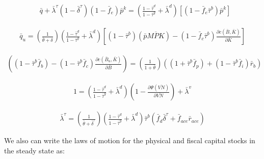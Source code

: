  \begin{equation}
\label{eqn:foc_i_tax_ss}
\begin{split}
 & \bar{q} + \bar{\lambda}^{\tau}(1-\bar{\delta}^{\tau})(1-\bar{f}_{e})\bar{p}^{k} =  \left(\frac{1-\bar{\tau}^{d}}{1-\bar{\tau}^{g}} + \bar{\lambda}^{d}\right)\left[(1-\bar{f}_{e}\bar{\tau}^{b})\bar{p}^{k}\right]
\end{split}
\end{equation}


 \begin{equation}
\label{eqn:foc_k_tax_ss}
\begin{split}
\bar{q}_{u} = \left(\frac{1}{\bar{\theta}+\delta}\right) \left(\frac{1-\bar{\tau}^{d}}{1-\bar{\tau}^{g}} + \bar{\lambda}^{d} \right)\left[(1-\bar{\tau}^{b})\left(\bar{p}\overline{MPK}\right)-(1-\bar{f}_{c}\bar{\tau}^{b}) \frac{\partial c(\bar{B},\bar{K})}{\partial \bar{K}} \right]
\end{split}
\end{equation}

 \begin{equation}
\label{eqn:foc_b_tax}
\begin{split}
 \left((1-\bar{\tau}^{b}\bar{f}_{b})-(1-\bar{\tau}^{b}\bar{f}_{c})\frac{\partial c(\bar{B}_{u},\bar{K})}{\partial \bar{B}}\right)=  \left(\frac{1}{1+\bar{\theta}}\right) \left((1+\bar{\tau}^{b}\bar{f}_{p})+(1-\bar{\tau}^{b}\bar{f}_{i})\bar{r}_{b}\right)
 \end{split}
\end{equation}

 \begin{equation}
\label{eqn:foc_vn_tax_ss}
\begin{split}
 1 = \left(\frac{1-\bar{\tau}^{d}}{1-\bar{\tau}^{g}} + \bar{\lambda}^{d}\right)\left(1-\frac{\partial \Psi(\overline{VN})}{\partial \overline{VN}}\right) + \bar{\lambda}^{v}
 \end{split}
\end{equation}

 \begin{equation}
\label{eqn:foc_ktau_tax_ss}
\begin{split}
 \bar{\lambda}^{\tau} =  \left(\frac{1}{\bar{\theta}+\bar{\delta}^{\tau}}\right)\left(\frac{1-\bar{\tau}^{d}}{1-\bar{\tau}^{g}} + \bar{\lambda}^{d} \right)\bar{\tau}^{b}\left(\bar{f}_{d}\bar{\delta}^{\tau}+\bar{f}_{ace}\bar{r}_{ace}\right)
 \end{split}
\end{equation}


We also can write the laws of motion for the physical and fiscal capital stocks in the steady state as:

